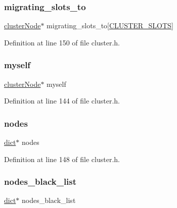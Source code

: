 \subsubsection{\texorpdfstring{migrating\+\_\+slots\+\_\+to}{migrating\_slots\_to}}
{\footnotesize\ttfamily \hyperlink{structcluster_node}{cluster\+Node}$\ast$ migrating\+\_\+slots\+\_\+to\mbox{[}\hyperlink{cluster_8h_aa3e2cb951eebb16725ecc3f5beefd9fd}{C\+L\+U\+S\+T\+E\+R\+\_\+\+S\+L\+O\+TS}\mbox{]}}



Definition at line 150 of file cluster.\+h.

\mbox{\label{structcluster_state_aff69bee08a3a0a58166a9f85acf12d56}} 
\subsubsection{\texorpdfstring{myself}{myself}}
{\footnotesize\ttfamily \hyperlink{structcluster_node}{cluster\+Node}$\ast$ myself}



Definition at line 144 of file cluster.\+h.

\mbox{\label{structcluster_state_a6e18e71a503d78c25fa93a49e05bf6f4}} 
\subsubsection{\texorpdfstring{nodes}{nodes}}
{\footnotesize\ttfamily \hyperlink{structdict}{dict}$\ast$ nodes}



Definition at line 148 of file cluster.\+h.

\mbox{\label{structcluster_state_a0dec12e8b1bd71942304f8073656d023}} 
\subsubsection{\texorpdfstring{nodes\+\_\+black\+\_\+list}{nodes\_black\_list}}
{\footnotesize\ttfamily \hyperlink{structdict}{dict}$\ast$ nodes\+\_\+black\+\_\+list}



